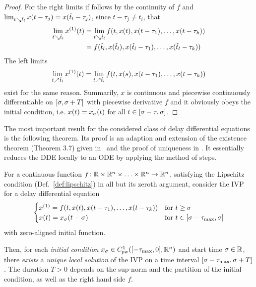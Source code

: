 \begin{proof}
        For the right limits if follows by the continuity of $f$ and $\lim_{t\searrow\hat{t}_l} x(t-\tau_j) = x(\hat{t}_l-\tau_j)$, since $t-\tau_j \neq t_i$, that
        \begin{align*}
            \lim_{t\downto\hat{t}_l} \D{x}(t)
            &= \lim_{t\downto\hat{t}_l} f(t,x(t),x(t-\tau_1),\ldots,x(t-\tau_k))\\
            &= f(\hat{t}_l,x(\hat{t}_l),x(\hat{t}_l-\tau_1),\ldots,x(\hat{t}_l-\tau_k))
        \end{align*}
        The left limits
        \begin{equation*}
            \lim_{t\upto\hat{t}_l} \D{x}(t) = \lim_{t\upto\hat{t}_l} f(t,x(s),x(t-\tau_1),\ldots,x(t-\tau_k)) 
        \end{equation*}
        exist for the same reason.
        Summarily, $x$ is continuous and piecewise continuously differentiable on $[\sigma,\sigma+T]$ with piecewise derivative $f$ and it obviously obeys the initial condition, i.e. $x(t)=x_{\sigma}(t)$ for all $t\in[\sigma-\tau,\sigma]$.
    \end{proof}

    The most important result for the considered class of delay differential equations is the following theorem.
    Its proof is an adaption and extension of the existence theorem (Theorem 3.7) given in~\cite{Smith10IntroDDE} and the proof of uniqueness in \cite{PruessWilke10GewDiffGl}. It essentially reduces the DDE locally to an ODE by applying the method of steps.

    \begin{theorem}
        \label{thm:solution-existence}
        For a continuous function $f\colon\mathbb{R}\times\mathbb{R}^n\times\ldots\times\mathbb{R}^n\to\mathbb{R}^n$, satisfying the Lipschitz condition (Def.~\ref{def:lipschitz}) in all but its zeroth argument, consider the IVP for a delay differential equation
        \begin{equation}
            \begin{cases}
                \D{x} = f(t,x(t),x(t-\tau_1),\ldots,x(t-\tau_k)) & \text{for } t\geq\tzero\\
                x(t) = x_\tzero(t-\tzero) & \text{for } t\in\compactum{\tzero-\taumax}{\tzero}
            \end{cases}
        \end{equation}
        with zero-aligned initial function.
        

        Then, for each \emph{initial condition} $x_{\tzero}\in\statespace[-\taumax]$ and start time $\sigma\in\mathbb{R}$, there \emph{exists} a \emph{unique local solution} of the IVP on a time interval $[\sigma-\tau_{\max},\sigma+T]$.
        The duration $T>0$ depends on the sup-norm and the partition of the initial condition, as well as the right hand side $f$.
    \end{theorem}


